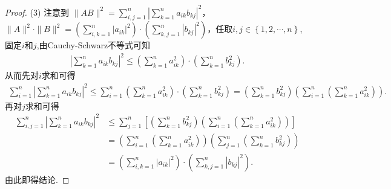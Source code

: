 \documentclass[../../main.tex]{subfiles}%
\begin{document}
\begin{proof}
(3) 注意到 $\|AB\|^2 = \sum_{i,j = 1}^{n}\left|\sum_{k = 1}^{n}a_{ik}b_{kj}\right|^2$，$\|A\|^2\cdot\|B\|^2 = \left(\sum_{i,k = 1}^{n}|a_{ik}|^2\right)\cdot\left(\sum_{k,j = 1}^{n}|b_{kj}|^2\right)$，任取$i,j\in \left\{ 1,2,\cdots ,n \right\}$,固定$i$和$j$,由Cauchy-Schwarz不等式可知
\begin{align*}
\left| \sum_{k=1}^n{a_{ik}b_{kj}} \right|^2\leqslant \left( \sum_{k=1}^n{a_{ik}^{2}} \right) \cdot \left( \sum_{k=1}^n{b_{kj}^{2}} \right) .
\end{align*}
从而先对$i$求和可得
\begin{align*}
\sum_{i=1}^n{\left| \sum_{k=1}^n{a_{ik}b_{kj}} \right|^2}\leqslant \sum_{i=1}^n{\left( \sum_{k=1}^n{a_{ik}^{2}} \right) \cdot \left( \sum_{k=1}^n{b_{kj}^{2}} \right)}=\left( \sum_{k=1}^n{b_{kj}^{2}} \right) \left( \sum_{i=1}^n{\left( \sum_{k=1}^n{a_{ik}^{2}} \right)} \right) .
\end{align*}
再对$j$求和可得
\begin{align*}
\sum_{i,j=1}^n{\left| \sum_{k=1}^n{a_{ik}b_{kj}} \right|^2}&\leqslant \sum_{j=1}^n{\left[ \left( \sum_{k=1}^n{b_{kj}^{2}} \right) \left( \sum_{i=1}^n{\left( \sum_{k=1}^n{a_{ik}^{2}} \right)} \right) \right]}\\
&=\left( \sum_{i=1}^n{\left( \sum_{k=1}^n{a_{ik}^{2}} \right)} \right) \left( \sum_{j=1}^n{\left( \sum_{k=1}^n{b_{kj}^{2}} \right)} \right) \\
&=\left( \sum_{i,k=1}^n{|a_{ik}|^2} \right) \cdot \left( \sum_{k,j=1}^n{|b_{kj}|^2} \right) .
\end{align*}
由此即得结论.

\end{proof}
\end{document}
